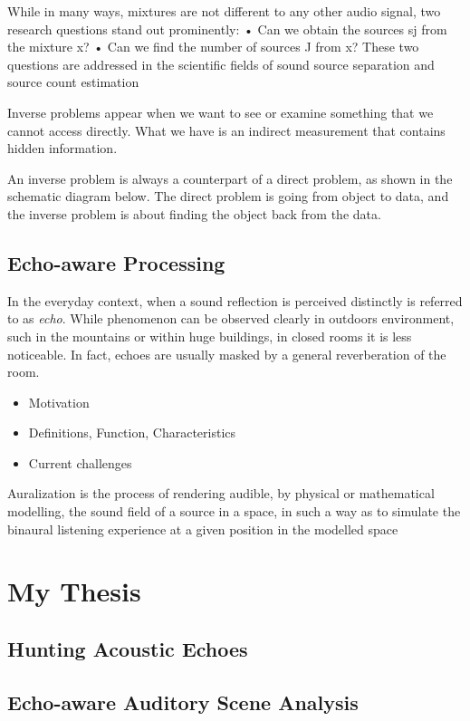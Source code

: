 While in many ways, mixtures are not different to any other audio signal, two research questions stand out prominently: • Can we obtain the sources sj from the mixture x? • Can we find the number of sources J from x? These two questions are addressed in the scientific fields of sound
source separation and source count estimation


Inverse problems appear when we want to see or examine something that we cannot access directly. What we have is an indirect measurement that contains hidden information.

An inverse problem is always a counterpart of a direct problem, as shown in the schematic diagram below. The direct problem is going from object to data, and the inverse problem is about finding the object back from the data.

\subsection{Echo-aware Processing}
In the everyday context, when a sound reflection is perceived distinctly is referred to as \textit{echo}.
While phenomenon can be observed clearly in outdoors environment, such in the mountains or within huge buildings,
in closed rooms it is less noticeable. In fact, echoes are usually masked by a general reverberation of the room.

\begin{itemize}
    \item Motivation
    \item Definitions, Function, Characteristics
    \item Current challenges
\end{itemize}

Auralization is the process of rendering audible, by physical or mathematical modelling, the sound field
of a source in a space, in such a way as to simulate the binaural listening experience at a given position in the modelled space

\section{My Thesis}
\subsection{Hunting Acoustic Echoes}
\subsection{Echo-aware Auditory Scene Analysis}


